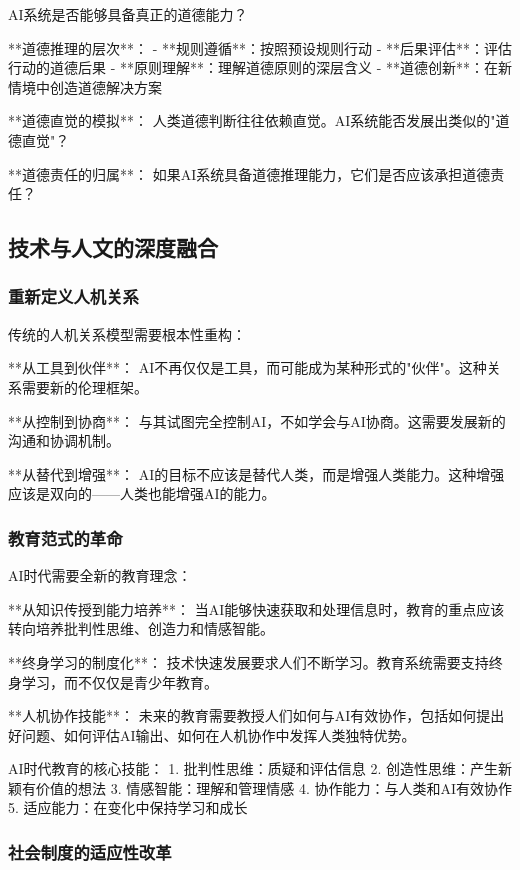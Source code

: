 AI系统是否能够具备真正的道德能力？

**道德推理的层次**：
- **规则遵循**：按照预设规则行动
- **后果评估**：评估行动的道德后果
- **原则理解**：理解道德原则的深层含义
- **道德创新**：在新情境中创造道德解决方案

**道德直觉的模拟**：
人类道德判断往往依赖直觉。AI系统能否发展出类似的"道德直觉"？

**道德责任的归属**：
如果AI系统具备道德推理能力，它们是否应该承担道德责任？

\subsection{技术与人文的深度融合} %

\subsubsection{重新定义人机关系}

传统的人机关系模型需要根本性重构：

**从工具到伙伴**：
AI不再仅仅是工具，而可能成为某种形式的"伙伴"。这种关系需要新的伦理框架。

**从控制到协商**：
与其试图完全控制AI，不如学会与AI协商。这需要发展新的沟通和协调机制。

**从替代到增强**：
AI的目标不应该是替代人类，而是增强人类能力。这种增强应该是双向的——人类也能增强AI的能力。

\subsubsection{教育范式的革命}

AI时代需要全新的教育理念：

**从知识传授到能力培养**：
当AI能够快速获取和处理信息时，教育的重点应该转向培养批判性思维、创造力和情感智能。

**终身学习的制度化**：
技术快速发展要求人们不断学习。教育系统需要支持终身学习，而不仅仅是青少年教育。

**人机协作技能**：
未来的教育需要教授人们如何与AI有效协作，包括如何提出好问题、如何评估AI输出、如何在人机协作中发挥人类独特优势。

\begin{center}
AI时代教育的核心技能：
1. 批判性思维：质疑和评估信息
2. 创造性思维：产生新颖有价值的想法
3. 情感智能：理解和管理情感
4. 协作能力：与人类和AI有效协作
5. 适应能力：在变化中保持学习和成长
\end{center}

\subsubsection{社会制度的适应性改革}

